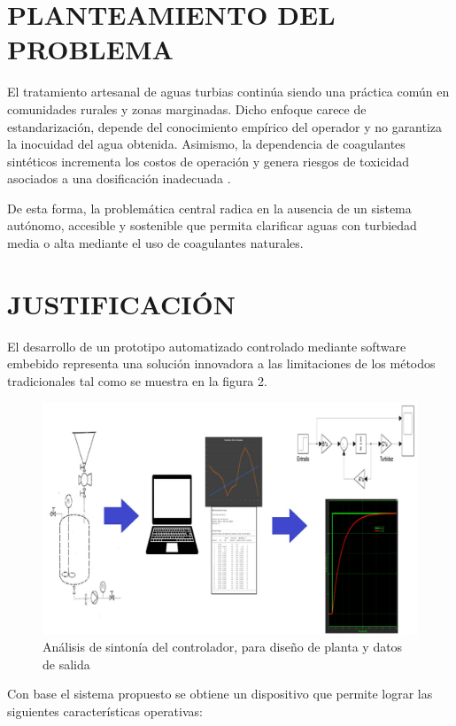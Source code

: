 \documentclass[conference]{IEEEtran}
\begin{document}
	\section{ PLANTEAMIENTO DEL PROBLEMA}
	
	El tratamiento artesanal de aguas turbias continúa siendo una práctica común en comunidades rurales y zonas marginadas. Dicho enfoque carece de estandarización, depende del conocimiento empírico del operador y no garantiza la inocuidad del agua obtenida. Asimismo, la dependencia de coagulantes sintéticos incrementa los costos de operación y genera riesgos de toxicidad asociados a una dosificación inadecuada \cite{b6}.
	
	De esta forma, la problemática central radica en la ausencia de un sistema autónomo, accesible y sostenible que permita clarificar aguas con turbiedad media o alta mediante el uso de coagulantes naturales.
	
	\section{JUSTIFICACIÓN}
	El desarrollo de un prototipo automatizado controlado mediante software embebido representa una solución innovadora a las limitaciones de los métodos tradicionales tal como se muestra en la figura 2. 
	
	\begin{figure}[htbp]
		\centering
		\includegraphics[width=\columnwidth]{fig2.jpg}
		\caption{Análisis de sintonía del controlador, para diseño de planta y datos de salida}
		\label{fig:esquema-sistema}
	\end{figure}
	
	Con base el sistema propuesto se obtiene un dispositivo que permite lograr las siguientes características operativas:
	
\end{document}
